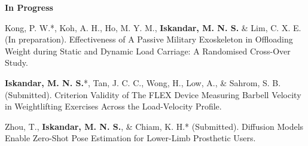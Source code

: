 \documentclass[../main.tex]{subfiles}
\begin{document}
        \textbf{In Progress}
        \def\labelprefix{P}
        \begin{etaremune}
            \item\label{article: spm exoskeleton}{Kong, P. W.*, Koh, A. H., Ho, M. Y. M., \textbf{Iskandar, M. N. S.} \& Lim, C. X. E. (In preparation). Effectiveness of A Passive Military Exoskeleton in Offloading Weight during Static and Dynamic Load Carriage: A Randomised Cross-Over Study.}
            
            \item\label{article: fyp}{\textbf{Iskandar, M. N. S.}*, Tan, J. C. C., Wong, H., Low, A., \& Sahrom, S. B. (Submitted). Criterion Validity of The FLEX Device Measuring Barbell Velocity in Weightlifting Exercises Across the Load-Velocity Profile.}
            
            \item\label{article: diffusion_openpose}{Zhou, T., \textbf{Iskandar, M. N. S.}, \& Chiam, K. H.* (Submitted). Diffusion Models Enable Zero-Shot Pose Estimation for Lower-Limb Prosthetic Users.}
        \end{etaremune}
        
  \resumeSubHeadingListEnd
\end{document}
